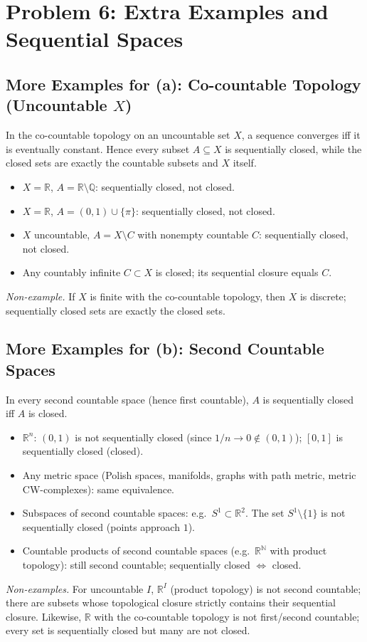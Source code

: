 \documentclass[12pt,a4paper]{article}
\theoremstyle{plain}
\theoremstyle{definition}
\theoremstyle{remark}
\theoremstyle{remark}
\begin{document}
	\section*{Problem 6: Extra Examples and Sequential Spaces}
	
	\subsection*{More Examples for (a): Co-countable Topology (Uncountable $X$)}
	In the co-countable topology on an uncountable set $X$, a sequence converges iff it is eventually constant.
	Hence every subset $A\subseteq X$ is sequentially closed, while the closed sets are exactly the countable subsets and $X$ itself.
	\begin{itemize}
		\item $X=\mathbb{R}$, $A=\mathbb{R}\setminus\mathbb{Q}$: sequentially closed, not closed.
		\item $X=\mathbb{R}$, $A=(0,1)\cup\{\pi\}$: sequentially closed, not closed.
		\item $X$ uncountable, $A=X\setminus C$ with nonempty countable $C$: sequentially closed, not closed.
		\item Any countably infinite $C\subset X$ is closed; its sequential closure equals $C$.
	\end{itemize}
	\emph{Non-example.} If $X$ is finite with the co-countable topology, then $X$ is discrete; sequentially closed sets are exactly the closed sets.
	
	\subsection*{More Examples for (b): Second Countable Spaces}
	In every second countable space (hence first countable), $A$ is sequentially closed iff $A$ is closed.
	\begin{itemize}
		\item $\mathbb{R}^n$: $(0,1)$ is not sequentially closed (since $1/n\to0\notin(0,1)$); $[0,1]$ is sequentially closed (closed).
		\item Any metric space (Polish spaces, manifolds, graphs with path metric, metric CW-complexes): same equivalence.
		\item Subspaces of second countable spaces: e.g.\ $S^1\subset\mathbb{R}^2$. The set $S^1\setminus\{1\}$ is not sequentially closed (points approach $1$).
		\item Countable products of second countable spaces (e.g.\ $\mathbb{R}^{\mathbb N}$ with product topology): still second countable; sequentially closed $\Leftrightarrow$ closed.
	\end{itemize}
	\emph{Non-examples.} For uncountable $I$, $\mathbb{R}^I$ (product topology) is not second countable; there are subsets whose topological closure strictly contains their sequential closure. Likewise, $\mathbb{R}$ with the co-countable topology is not first/second countable; every set is sequentially closed but many are not closed.
	
\end{document}
